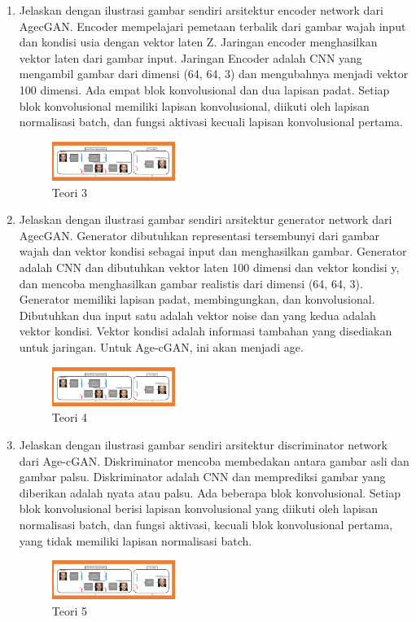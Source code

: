 \begin{enumerate}
	\item Jelaskan dengan ilustrasi gambar sendiri arsitektur encoder network dari AgecGAN.
	\hfill\break
	Encoder mempelajari pemetaan terbalik dari gambar wajah input dan kondisi usia dengan vektor laten Z. Jaringan encoder menghasilkan vektor laten dari gambar input. Jaringan Encoder adalah CNN yang mengambil gambar dari dimensi (64, 64, 3) dan mengubahnya menjadi vektor 100 dimensi. Ada empat blok konvolusional dan dua lapisan padat. Setiap blok konvolusional memiliki lapisan konvolusional, diikuti oleh lapisan normalisasi batch, dan fungsi aktivasi kecuali lapisan konvolusional pertama.
	\begin{figure}[H]
		\includegraphics[width=4cm]{figures/1174027/9/teori345.png}
		\centering
		\caption{Teori 3}
	\end{figure}

	\item Jelaskan dengan ilustrasi gambar sendiri arsitektur generator network dari AgecGAN.
	\hfill\break
	Generator dibutuhkan representasi tersembunyi dari gambar wajah dan vektor kondisi sebagai input dan menghasilkan gambar. Generator adalah CNN dan dibutuhkan vektor laten 100 dimensi dan vektor kondisi y, dan mencoba menghasilkan gambar realistis dari dimensi (64, 64, 3). Generator memiliki lapisan padat, membingungkan, dan konvolusional. Dibutuhkan dua input satu adalah vektor noise dan yang kedua adalah vektor kondisi. Vektor kondisi adalah informasi tambahan yang disediakan untuk jaringan. Untuk Age-cGAN, ini akan menjadi age.
	\begin{figure}[H]
		\includegraphics[width=4cm]{figures/1174027/9/teori345.png}
		\centering
		\caption{Teori 4}
	\end{figure}

	\item Jelaskan dengan ilustrasi gambar sendiri arsitektur discriminator network dari Age-cGAN.
	\hfill\break
	Diskriminator mencoba membedakan antara gambar asli dan gambar palsu. Diskriminator adalah CNN dan memprediksi gambar yang diberikan adalah nyata atau palsu. Ada beberapa blok konvolusional. Setiap blok konvolusional berisi lapisan konvolusional yang diikuti oleh lapisan normalisasi batch, dan fungsi aktivasi, kecuali blok konvolusional pertama, yang tidak memiliki lapisan normalisasi batch.
	\begin{figure}[H]
		\includegraphics[width=4cm]{figures/1174027/9/teori345.png}
		\centering
		\caption{Teori 5}
	\end{figure}


\end{enumerate}

